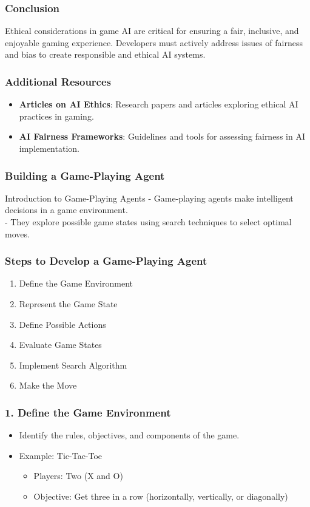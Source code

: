 \documentclass[aspectratio=169]{beamer}
\begin{document}
\begin{frame}[fragile]
  \frametitle{Conclusion}
  Ethical considerations in game AI are critical for ensuring a fair, inclusive, and enjoyable gaming experience. Developers must actively address issues of fairness and bias to create responsible and ethical AI systems.
\end{frame}

\begin{frame}[fragile]
  \frametitle{Additional Resources}
  \begin{itemize}
    \item \textbf{Articles on AI Ethics}: Research papers and articles exploring ethical AI practices in gaming.
    \item \textbf{AI Fairness Frameworks}: Guidelines and tools for assessing fairness in AI implementation.
  \end{itemize}
\end{frame}

\begin{frame}[fragile]
    \frametitle{Building a Game-Playing Agent}
    \begin{block}{Introduction to Game-Playing Agents}
        - Game-playing agents make intelligent decisions in a game environment. \\
        - They explore possible game states using search techniques to select optimal moves.
    \end{block}
\end{frame}

\begin{frame}[fragile]
    \frametitle{Steps to Develop a Game-Playing Agent}
    \begin{enumerate}
        \item Define the Game Environment
        \item Represent the Game State
        \item Define Possible Actions
        \item Evaluate Game States
        \item Implement Search Algorithm
        \item Make the Move
    \end{enumerate}
\end{frame}

\begin{frame}[fragile]
    \frametitle{1. Define the Game Environment}
    \begin{itemize}
        \item Identify the rules, objectives, and components of the game.
        \item Example: Tic-Tac-Toe
        \begin{itemize}
            \item Players: Two (X and O)
            \item Objective: Get three in a row (horizontally, vertically, or diagonally)
        \end{itemize}
    \end{itemize}
\end{frame}
\end{document}

